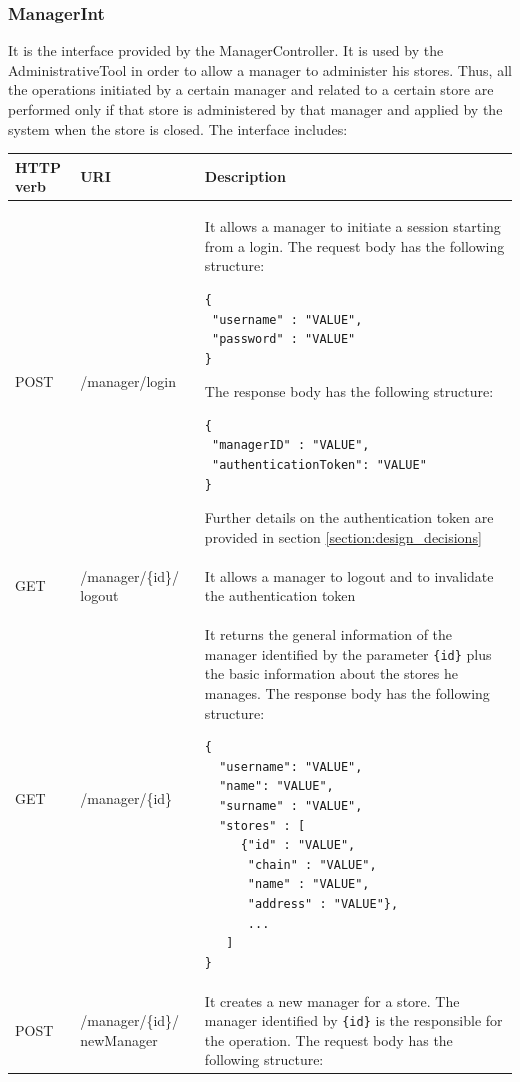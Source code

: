 \documentclass[a4paper,oneside,11pt]{book}
\begin{document}
    \subsubsection{ManagerInt}
    It is the interface provided by the ManagerController. It is used by the AdministrativeTool in order to allow a manager to administer his stores. Thus, all the operations initiated by a certain manager and related to a certain store are performed only if that store is administered by that manager and applied by the system when the store is closed. The interface includes:
    \begin{longtable}[c] { |>{\centering\arraybackslash}P{0.11\textwidth}|>{\centering\arraybackslash\ttfamily}H{0.23\textwidth}|H{0.50\textwidth}| }
        \hline
        \textbf{HTTP verb} & \textrm{\textbf{URI}} & \textbf{\textbf{Description}} \\ \hline
        POST & /manager/login & It allows a manager to initiate a session starting from a login. The request body has the following structure: 
        \begin{lstlisting}[language=jsonDD]
{
 "username" : "VALUE",
 "password" : "VALUE"
}
        \end{lstlisting}
        The response body has the following structure:
        \begin{lstlisting}[language=jsonDD]
{
 "managerID" : "VALUE",
 "authenticationToken": "VALUE"
}
        \end{lstlisting}
        Further details on the authentication token are provided in section \ref{section:design_decisions} \\ \hline
        GET & /manager/\{id\}/ logout & It allows a manager to logout and to invalidate the authentication token \\ \hline
        GET & /manager/\{id\} & It returns the general information of the manager identified by the parameter \texttt{\{id\}} plus the basic information about the stores he manages. The response body has the following structure:
        \begin{lstlisting}[language=jsonDD]
{
  "username": "VALUE",
  "name": "VALUE",
  "surname" : "VALUE",
  "stores" : [
     {"id" : "VALUE",
      "chain" : "VALUE",
      "name" : "VALUE",
      "address" : "VALUE"}, 
      ...
   ]
}
        \end{lstlisting} \\ \hline
        POST & /manager/\{id\}/ newManager & It creates a new manager for a store. The manager identified by \texttt{\{id\}} is the responsible for the operation. The request body has the following structure:

\end{longtable}
\end{document}

